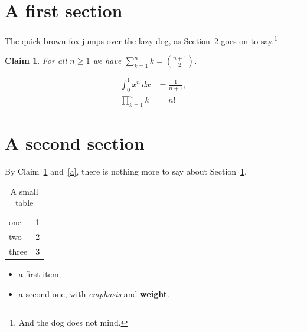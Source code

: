 \documentclass{article}
\newtheorem{claim}{Claim}
\begin{document}
\tableofcontents
\section{A first section}\label{first}
The quick brown fox jumps over the lazy dog, as Section~\ref{second} goes on to say.\footnote{And the dog does not mind.}
\begin{claim}\label{it}
For all $n\ge1$ we have $\sum_{k=1}^n k=\binom{n+1}{2}$.
\end{claim}
\begin{align}
\int_0^1 x^n\,dx&=\frac{1}{n+1},\label{a}\\
\prod_{k=1}^n k&=n!\label{b}
\end{align}
\section{A second section}\label{second}
By Claim~\ref{it} and~\eqref{a}, there is nothing more to say about Section~\ref{first}.
\begin{table}[h]\centering
\begin{tabular}{lr}one&1\\two&2\\three&3\end{tabular}
\caption{A small table}
\end{table}
\begin{itemize}\item a first item;\item a second one, with \emph{emphasis} and \textbf{weight}.\end{itemize}
\end{document}
